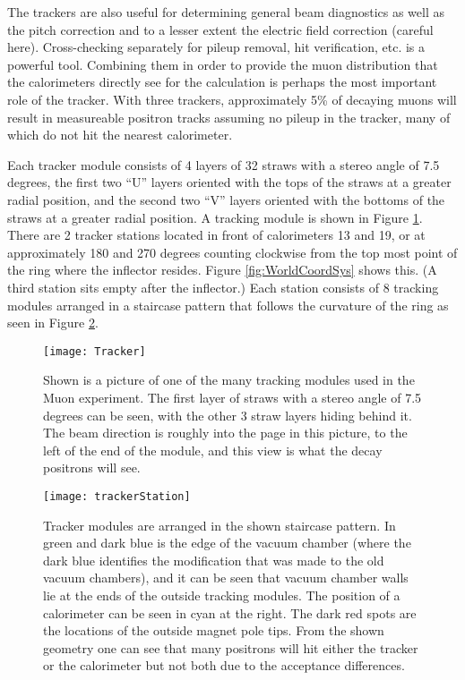The trackers are also useful for determining general beam diagnostics as well as the pitch correction and to a lesser extent the electric field correction (careful here). Cross-checking separately for pileup removal, hit verification, etc. is a powerful tool. Combining them in order to provide the muon distribution that the calorimeters directly see for the \wa calculation is perhaps the most important role of the tracker. With three trackers, approximately 5\% of decaying muons will result in measureable positron tracks assuming no pileup in the tracker, many of which do not hit the nearest calorimeter.

Each tracker module consists of 4 layers of 32 straws with a stereo angle of 7.5 degrees, the first two ``U'' layers oriented with the tops of the straws at a greater radial position, and the second two ``V'' layers oriented with the bottoms of the straws at a greater radial position. A tracking module is shown in Figure \ref{fig:tracker}. There are 2 tracker stations located in front of calorimeters 13 and 19, or at approximately 180 and 270 degrees counting clockwise from the top most point of the ring where the inflector resides. Figure \ref{fig:WorldCoordSys} shows this. (A third station sits empty after the inflector.) Each station consists of 8 tracking modules arranged in a staircase pattern that follows the curvature of the ring as seen in Figure \ref{fig:staircase}.

\begin{figure}[]
    \label{fig:tracker}
    \centering
    \texttt{[image: Tracker]}
    \caption[Tracker module]{Shown is a picture of one of the many tracking modules used in the Muon \gmtwo experiment. The first layer of straws with a stereo angle of 7.5 degrees can be seen, with the other 3 straw layers hiding behind it. The beam direction is roughly into the page in this picture, to the left of the end of the module, and this view is what the decay positrons will see.}
\end{figure}

\begin{figure}[]
    \label{fig:staircase}
    \centering
    \texttt{[image: trackerStation]}
    \caption[Tracker module arrangement]{Tracker modules are arranged in the shown staircase pattern. In green and dark blue is the edge of the vacuum chamber (where the dark blue identifies the modification that was made to the old vacuum chambers), and it can be seen that vacuum chamber walls lie at the ends of the outside tracking modules. The position of a calorimeter can be seen in cyan at the right. The dark red spots are the locations of the outside magnet pole tips. From the shown geometry one can see that many positrons will hit either the tracker or the calorimeter but not both due to the acceptance differences.}
\end{figure}


